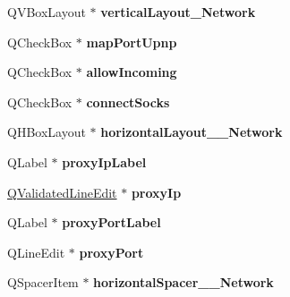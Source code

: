 \begin{DoxyCompactItemize}
\mbox{\label{class_ui___options_dialog_a51a53f2b9097c58b1c026cb4354444c2}} 
Q\+V\+Box\+Layout $\ast$ {\bfseries vertical\+Layout\+\_\+\+Network}
\item 
\mbox{\label{class_ui___options_dialog_a72bf5d8de490ba3fb1cc9f5489cd75b4}} 
Q\+Check\+Box $\ast$ {\bfseries map\+Port\+Upnp}
\item 
\mbox{\label{class_ui___options_dialog_a78c97e54c83abca0f2da3b0c2d10ea32}} 
Q\+Check\+Box $\ast$ {\bfseries allow\+Incoming}
\item 
\mbox{\label{class_ui___options_dialog_af5f3686e4eb6602a8a13df22223ce35c}} 
Q\+Check\+Box $\ast$ {\bfseries connect\+Socks}
\item 
\mbox{\label{class_ui___options_dialog_a257c8dd93df657a039e0790d41381457}} 
Q\+H\+Box\+Layout $\ast$ {\bfseries horizontal\+Layout\+\_\+\_\+\+Network}
\item 
\mbox{\label{class_ui___options_dialog_a8b4f57860d3eebc998dc37aad05aab1a}} 
Q\+Label $\ast$ {\bfseries proxy\+Ip\+Label}
\item 
\mbox{\label{class_ui___options_dialog_aecb6fd2c8a013b6ae8be4a651498827c}} 
\mbox{\hyperlink{class_q_validated_line_edit}{Q\+Validated\+Line\+Edit}} $\ast$ {\bfseries proxy\+Ip}
\item 
\mbox{\label{class_ui___options_dialog_a9faddc7660e2f442cd5a4ae8d06fdd2a}} 
Q\+Label $\ast$ {\bfseries proxy\+Port\+Label}
\item 
\mbox{\label{class_ui___options_dialog_a93dcedb128d1cc8e8281aa90b1a564dc}} 
Q\+Line\+Edit $\ast$ {\bfseries proxy\+Port}
\item 
\mbox{\label{class_ui___options_dialog_a15099fe2a40297bb5ef36c4b90af8d95}} 
Q\+Spacer\+Item $\ast$ {\bfseries horizontal\+Spacer\+\_\+\_\+\+Network}
\item 
\mbox{\label{class_ui___options_dialog_a1c94951678b436ee1a1890d47cee78c9}} 

\end{DoxyCompactItemize}
